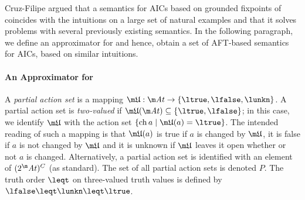 Cruz-Filipe argued that a semantics for AICs based on grounded fixpoints of \Op coincides with the intuitions on a large set of natural examples and that it solves problems with several previously existing semantics. 
In the following paragraph, we define an approximator for \Op and hence, obtain a set of AFT-based semantics for AICs, based on similar intuitions. 



% 

\paragraph{An Approximator for \Op}

A \emph{partial action set} is a mapping $\UUU:\atoms \to \{\ltrue,\lfalse,\lunkn\}$. A partial action set \UUU is \emph{two-valued} if $\UUU(\atoms)\subseteq\{\ltrue,\lfalse\}$; in this case, we identify $\UUU$ with the action set $\{\change a\mid \UUU(a)=\ltrue\}$. 
The intended reading of such a mapping is that $\UUU(a)$ is true if $a$ is changed by $\UUU$, it is false if $a$ is not changed by $\UUU$ and it is unknown if $\UUU$ leaves it open whether or not $a$ is changed. 
Alternatively, a partial action set is identified with an element of $(2^\atoms)^C$ (as standard). 
The set of all partial action sets is denoted $P$.
The truth order $\leqt$ on three-valued truth values is defined by $\lfalse\leqt\lunkn\leqt\ltrue$.

